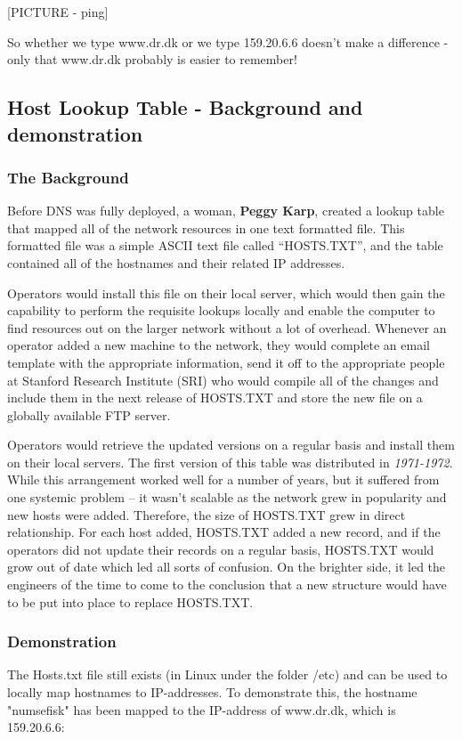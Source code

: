 [PICTURE - ping]

So whether we type www.dr.dk or we type 159.20.6.6 doesn't make a difference - only that www.dr.dk probably is easier to remember! \\

\subsection{Host Lookup Table - Background and demonstration}

\subsubsection{The Background} 
Before DNS was fully deployed, a woman, \textbf{Peggy Karp}, created a lookup table that mapped all of the network resources in one text formatted file. This formatted file was a simple ASCII text file called “HOSTS.TXT”, and the table contained all of the hostnames and their related IP addresses. 

Operators would install this file on their local server, which would then gain the capability to perform the requisite lookups locally and enable the computer to find resources out on the larger network without a lot of overhead. Whenever an operator added a new machine to the network, they would complete an email template with the appropriate information, send it off to the appropriate people at Stanford Research Institute (SRI) who would compile all of the changes and include them in the next release of HOSTS.TXT and store the new file on a globally available FTP server. 

Operators would retrieve the updated versions on a regular basis and install them on their local servers. The first version of this table was distributed in \textit{1971-1972}. While this arrangement worked well for a number of years, but it suffered from one systemic problem – it wasn’t scalable as the network grew in popularity and new hosts were added. Therefore, the size of HOSTS.TXT grew in direct relationship. For each host added, HOSTS.TXT added a new record, and if the operators did not update their records on a regular basis, HOSTS.TXT would grow out of date which led all sorts of confusion. On the brighter side, it led the engineers of the time to come to the conclusion that a new structure would have to be put into place to replace HOSTS.TXT.

\subsubsection{Demonstration}
The Hosts.txt file still exists (in Linux under the folder /etc) and can be used to locally map hostnames to IP-addresses. To demonstrate this, the hostname "numsefisk" has been mapped to the IP-address of www.dr.dk, which is 159.20.6.6:

